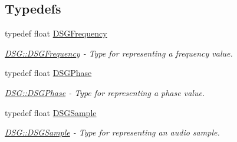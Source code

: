 \subsection*{Typedefs}
\begin{DoxyCompactItemize}
\item 
typedef float \hyperlink{namespace_d_s_g_a4315a061386fa1014fda09b15d3a6973}{D\+S\+G\+Frequency}
\begin{DoxyCompactList}\small\item\em \hyperlink{namespace_d_s_g_a4315a061386fa1014fda09b15d3a6973}{D\+S\+G\+::\+D\+S\+G\+Frequency} -\/ Type for representing a frequency value. \end{DoxyCompactList}\item 
typedef float \hyperlink{namespace_d_s_g_a44431ce1eb0a7300efdd207bc879e52c}{D\+S\+G\+Phase}
\begin{DoxyCompactList}\small\item\em \hyperlink{namespace_d_s_g_a44431ce1eb0a7300efdd207bc879e52c}{D\+S\+G\+::\+D\+S\+G\+Phase} -\/ Type for representing a phase value. \end{DoxyCompactList}\item 
typedef float \hyperlink{namespace_d_s_g_ac39a94cd27ebcd9c1e7502d0c624894a}{D\+S\+G\+Sample}
\begin{DoxyCompactList}\small\item\em \hyperlink{namespace_d_s_g_ac39a94cd27ebcd9c1e7502d0c624894a}{D\+S\+G\+::\+D\+S\+G\+Sample} -\/ Type for representing an audio sample. \end{DoxyCompactList}\end{DoxyCompactItemize}
